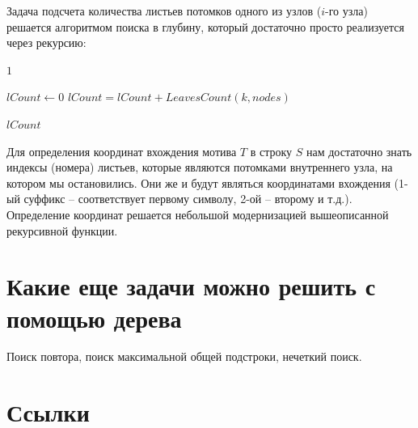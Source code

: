 \documentclass[letterpaper, 11pt]{article}
\begin{document}
Задача подсчета количества листьев потомков одного из узлов ($i$-го узла) решается алгоритмом поиска в глубину, который достаточно просто реализуется через рекурсию:

\begin{algorithmic}[1]
\State \Return $1$
\EndIf
\item[]
\State $lCount \gets 0$
\State $lCount = lCount + LeavesCount(k, nodes)$
\EndFor
\item[]
\State \Return $lCount$
\EndProcedure
\end{algorithmic}

Для определения координат вхождения мотива $T$ в строку $S$ нам достаточно знать индексы (номера) листьев, которые являются потомками внутреннего узла, на котором мы остановились. Они же и будут являться координатами вхождения (1-ый суффикс -- соответствует первому символу, 2-ой -- второму и т.д.). Определение координат решается небольшой модернизацией вышеописанной рекурсивной функции.

\section{Какие еще задачи можно решить с помощью дерева}
\par
Поиск повтора, поиск максимальной общей подстроки, нечеткий поиск.

\section{Ссылки}

\begingroup
\renewcommand{\section}[2]{}%
\begin{thebibliography}{7}


\end{thebibliography}
\endgroup
\end{document}
